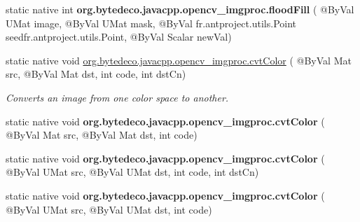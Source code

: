\begin{DoxyCompactItemize}
static native int {\bfseries org.\+bytedeco.\+javacpp.\+opencv\+\_\+imgproc.\+flood\+Fill} ( @By\+Val U\+Mat image, @By\+Val U\+Mat mask, @By\+Val fr.antproject.utils.Point seed\+fr.antproject.utils.Point, @By\+Val Scalar new\+Val)
\item 
static native void \hyperlink{group__imgproc__misc_gaab99985581c43cce9df680e6586cb9ef}{org.\+bytedeco.\+javacpp.\+opencv\+\_\+imgproc.\+cvt\+Color} ( @By\+Val Mat src, @By\+Val Mat dst, int code, int dst\+Cn)
\begin{DoxyCompactList}\small\item\em Converts an image from one color space to another. \end{DoxyCompactList}\item 
\mbox{\label{group__imgproc__misc_gaa8e0dcca6becdd3148e241a90e29e670}} 
static native void {\bfseries org.\+bytedeco.\+javacpp.\+opencv\+\_\+imgproc.\+cvt\+Color} ( @By\+Val Mat src, @By\+Val Mat dst, int code)
\item 
\mbox{\label{group__imgproc__misc_gaa8da1141a7257ac493670f5e3ff57ee6}} 
static native void {\bfseries org.\+bytedeco.\+javacpp.\+opencv\+\_\+imgproc.\+cvt\+Color} ( @By\+Val U\+Mat src, @By\+Val U\+Mat dst, int code, int dst\+Cn)
\item 
\mbox{\label{group__imgproc__misc_ga1f5d494e7dc7978e2c6ead86fbb90aad}} 
static native void {\bfseries org.\+bytedeco.\+javacpp.\+opencv\+\_\+imgproc.\+cvt\+Color} ( @By\+Val U\+Mat src, @By\+Val U\+Mat dst, int code)
\end{DoxyCompactItemize}
